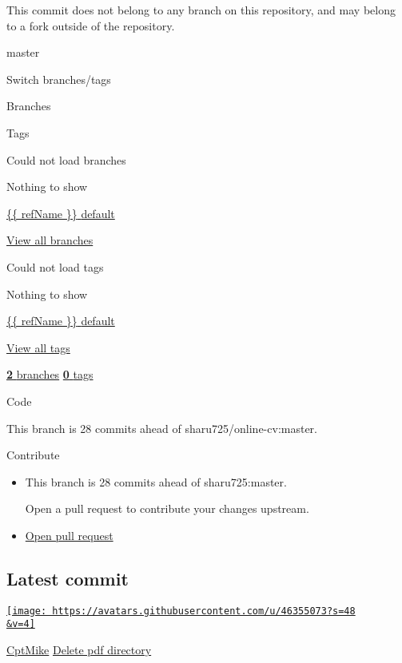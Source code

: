 \documentclass[
  english,
]{article}
\begin{document}
\hypertarget{repo-content-pjax-container}{}
\hypertarget{spoof-warning}{}
This commit does not belong to any branch on this repository, and may
belong to a fork outside of the repository.

{master} {}

{Switch branches/tags}

Branches

Tags

\hypertarget{ref-list-branches}{}
Could not load branches

Nothing to show

\href{https://github.com/CptMike/online-cv/tree/\%7B\%7B\%20urlEncodedRefName\%20\%7D\%7D}{
{\{\{ refName \}\}} {default}}

\href{/CptMike/online-cv/branches}{View all branches}

\hypertarget{tags-menu}{}
Could not load tags

Nothing to show

\href{https://github.com/CptMike/online-cv/tree/\%7B\%7B\%20urlEncodedRefName\%20\%7D\%7D}{
{\{\{ refName \}\}} {default}}

\href{/CptMike/online-cv/tags}{View all tags}

\href{/CptMike/online-cv/branches}{ \textbf{2} {branches}}
\href{/CptMike/online-cv/tags}{ \textbf{0} {tags}}

{ }

Code{}

This branch is 28 commits ahead of sharu725/online-cv:master.

Contribute

\begin{itemize}
\item
  This branch is 28 commits ahead of sharu725:master.

  Open a pull request to contribute your changes upstream.
\item
  \href{/CptMike/online-cv/pull/new/master}{Open pull request}
\end{itemize}

\hypertarget{latest-commit}{%
\subsection{Latest commit}\label{latest-commit}}

\href{/CptMike}{\texttt{[image: https://avatars.githubusercontent.com/u/46355073?s=48\\\&v=4]}}

\href{/CptMike/online-cv/commits?author=CptMike}{CptMike} {
\href{/CptMike/online-cv/commit/a3f8f985a16f2768fce052b7d2ded3d55f6ea65d}{Delete
pdf directory} }
\end{document}
